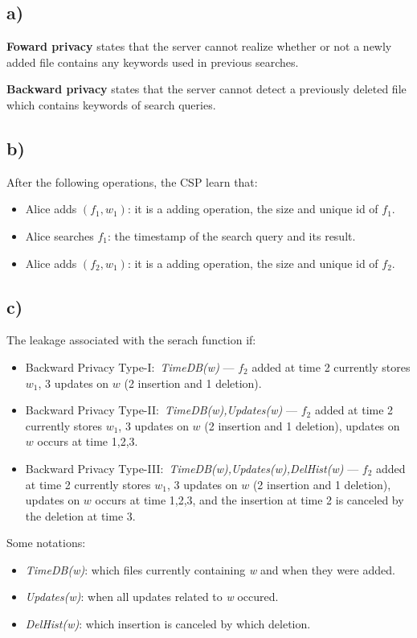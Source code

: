 \subsection*{a)}
%
\textbf{Foward privacy} states that the server cannot realize whether or not a newly added
file contains any keywords used in previous searches.

\textbf{Backward privacy} states that the server cannot detect a previously deleted file
which contains keywords of search queries.

\subsection*{b)}
%
After the following operations, the CSP learn that:
\begin{itemize}
    \item Alice adds \((f_1,w_1)\): it is a adding operation, the size and unique id of \(f_1\).
    \item Alice searches \(f_1\): the timestamp of the search query and its result.
    \item Alice adds \((f_2,w_1)\): it is a adding operation, the size and unique id of \(f_2\).
\end{itemize}

\subsection*{c)}
%
The leakage associated with the serach function if:
\begin{itemize}
    \item Backward Privacy Type-I:\ \emph{TimeDB(w)} --- \(f_2\) added at time 2 currently
    stores \(w_1\), 3 updates on \(w\) (2 insertion and 1 deletion).
    \item Backward Privacy Type-II:\ \emph{TimeDB(w),Updates(w)} --- \(f_2\) added at time 2
    currently stores \(w_1\), 3 updates on \(w\) (2 insertion and 1 deletion), updates on
    \(w\) occurs at time 1,2,3.
    \item Backward Privacy Type-III:\ \emph{TimeDB(w),Updates(w),DelHist(w)} --- \(f_2\)
    added at time 2 currently stores \(w_1\), 3 updates on \(w\) (2 insertion and 1 deletion),
    updates on \(w\) occurs at time 1,2,3, and the insertion at time 2 is canceled by the
    deletion at time 3.
\end{itemize}

Some notations:
\begin{itemize}
    \item \emph{TimeDB(w)}: which files currently containing
    \emph{w} and when they were added.
    \item \emph{Updates(w)}: when all updates related to \emph{w} occured.
    \item \emph{DelHist(w)}: which insertion is canceled by
    which deletion.
\end{itemize}